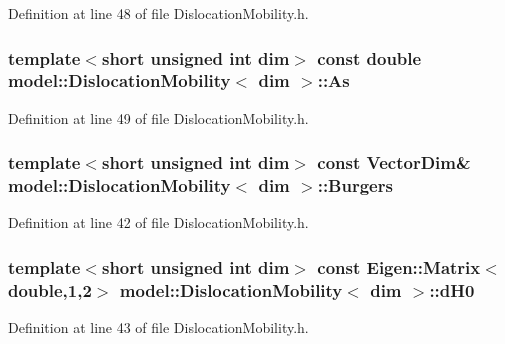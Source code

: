 Definition at line 48 of file Dislocation\+Mobility.\+h.

\hypertarget{classmodel_1_1_dislocation_mobility_a721ae6abb598d3d69e65001fc5f7f8f9}{}
\subsubsection[{As}]{\setlength{\rightskip}{0pt plus 5cm}template$<$short unsigned int dim$>$ const double {\bf model\+::\+Dislocation\+Mobility}$<$ {\bf dim} $>$\+::As}\label{classmodel_1_1_dislocation_mobility_a721ae6abb598d3d69e65001fc5f7f8f9}


Definition at line 49 of file Dislocation\+Mobility.\+h.

\hypertarget{classmodel_1_1_dislocation_mobility_a9f1ca817486fb1a6303ab7b07c923205}{}
\subsubsection[{Burgers}]{\setlength{\rightskip}{0pt plus 5cm}template$<$short unsigned int dim$>$ const {\bf Vector\+Dim}\& {\bf model\+::\+Dislocation\+Mobility}$<$ {\bf dim} $>$\+::Burgers}\label{classmodel_1_1_dislocation_mobility_a9f1ca817486fb1a6303ab7b07c923205}


Definition at line 42 of file Dislocation\+Mobility.\+h.

\hypertarget{classmodel_1_1_dislocation_mobility_a15e09f67ce91fc5988559ff7a6b077ee}{}
\subsubsection[{d\+H0}]{\setlength{\rightskip}{0pt plus 5cm}template$<$short unsigned int dim$>$ const Eigen\+::\+Matrix$<$double,1,2$>$ {\bf model\+::\+Dislocation\+Mobility}$<$ {\bf dim} $>$\+::d\+H0}\label{classmodel_1_1_dislocation_mobility_a15e09f67ce91fc5988559ff7a6b077ee}


Definition at line 43 of file Dislocation\+Mobility.\+h.

\hypertarget{classmodel_1_1_dislocation_mobility_a171d42953b3a3cbac83c78e96e2bc656}{}
